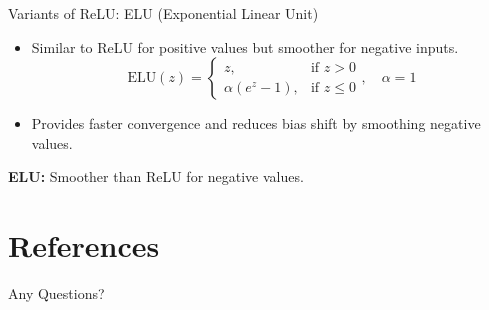 \documentclass[serif, aspectratio=169]{beamer}
\begin{document}
\begin{frame}{Variants of ReLU: ELU (Exponential Linear Unit)}
    \begin{itemize}
        \item Similar to ReLU for positive values but smoother for negative inputs.
        \begin{equation*}
            \text{ELU}(z) =
            \begin{cases}
                z, & \text{if } z > 0 \\
                \alpha (e^z - 1), & \text{if } z \leq 0
            \end{cases}, \quad \alpha = 1
        \end{equation*}
        \item Provides faster convergence and reduces bias shift by smoothing negative values.
    \end{itemize}
                \begin{center}
            \end{center}
            \vspace{-0.3cm}
            \centering
            \textbf{ELU:} Smoother than ReLU for negative values.
\end{frame}





\section{References}
\begin{frame}[allowframebreaks]
    
    
    \nocite{*} %
\end{frame}


\begin{frame}
    \begin{center}
        {\Huge Any Questions?}
    \end{center}
\end{frame}
\end{document}
